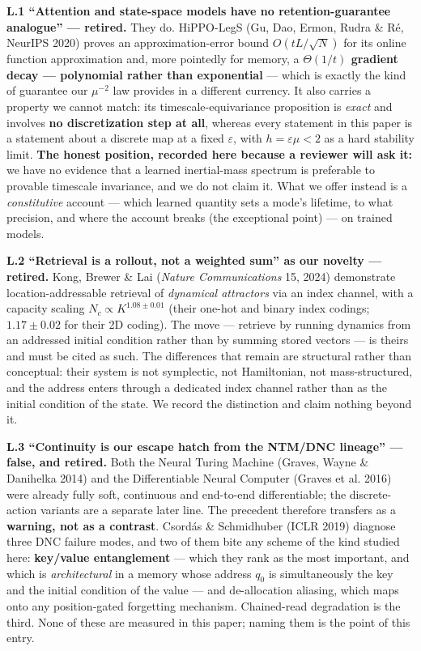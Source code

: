 \documentclass[10pt]{article}
\begin{document}
\textbf{L.1 ``Attention and state-space models have no retention-guarantee analogue'' --- retired.} They do. HiPPO-LegS (Gu, Dao, Ermon, Rudra \& Ré, NeurIPS 2020) proves an approximation-error bound $O(tL/\sqrt N)$ for its online function approximation and, more pointedly for memory, a \textbf{$\Theta(1/t)$ gradient decay --- polynomial rather than exponential} --- which is exactly the kind of guarantee our $\mu^{-2}$ law provides in a different currency. It also carries a property we cannot match: its timescale-equivariance proposition is \emph{exact} and involves \textbf{no discretization step at all}, whereas every statement in this paper is a statement about a discrete map at a fixed $\varepsilon$, with $h=\varepsilon\mu<2$ as a hard stability limit. \textbf{The honest position, recorded here because a reviewer will ask it:} we have no evidence that a learned inertial-mass spectrum is preferable to provable timescale invariance, and we do not claim it. What we offer instead is a \emph{constitutive} account --- which learned quantity sets a mode's lifetime, to what precision, and where the account breaks (the exceptional point) --- on trained models.

\textbf{L.2 ``Retrieval is a rollout, not a weighted sum'' as our novelty --- retired.} Kong, Brewer \& Lai (\emph{Nature Communications} 15, 2024) demonstrate location-addressable retrieval of \emph{dynamical attractors} via an index channel, with a capacity scaling $N_c\propto K^{1.08\pm0.01}$ (their one-hot and binary index codings; $1.17\pm0.02$ for their 2D coding). The move --- retrieve by running dynamics from an addressed initial condition rather than by summing stored vectors --- is theirs and must be cited as such. The differences that remain are structural rather than conceptual: their system is not symplectic, not Hamiltonian, not mass-structured, and the address enters through a dedicated index channel rather than as the initial condition of the state. We record the distinction and claim nothing beyond it.

\textbf{L.3 ``Continuity is our escape hatch from the NTM/DNC lineage'' --- false, and retired.} Both the Neural Turing Machine (Graves, Wayne \& Danihelka 2014) and the Differentiable Neural Computer (Graves et al. 2016) were already fully soft, continuous and end-to-end differentiable; the discrete-action variants are a separate later line. The precedent therefore transfers as a \textbf{warning, not as a contrast}. Csordás \& Schmidhuber (ICLR 2019) diagnose three DNC failure modes, and two of them bite any scheme of the kind studied here: \textbf{key/value entanglement} --- which they rank as the most important, and which is \emph{architectural} in a memory whose address $q_0$ is simultaneously the key and the initial condition of the value --- and de-allocation aliasing, which maps onto any position-gated forgetting mechanism. Chained-read degradation is the third. None of these are measured in this paper; naming them is the point of this entry.
\end{document}
